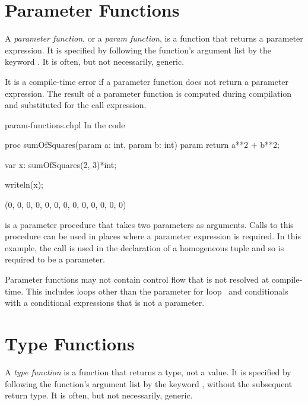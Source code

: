 \section{Parameter Functions}
\label{Parameter_Functions}

A \emph{parameter function}, or a \emph{param function}, is a function that returns a parameter
expression.  It is specified by following the function's argument list
by the keyword .  It is often, but not necessarily,
generic.

It is a compile-time error if a parameter function does not return a
parameter expression.  The result of a parameter function is computed
during compilation and substituted for the call expression.

\begin{chapelexample}{param-functions.chpl}
In the code
\begin{chapel}
proc sumOfSquares(param a: int, param b: int) param
  return a**2 + b**2;

var x: sumOfSquares(2, 3)*int;
\end{chapel}
\begin{chapelpost}
writeln(x);
\end{chapelpost}
\begin{chapeloutput}
(0, 0, 0, 0, 0, 0, 0, 0, 0, 0, 0, 0, 0)
\end{chapeloutput}
 is a parameter procedure that takes
two parameters as arguments.  Calls to this procedure can be used in
places where a parameter expression is required.  In this example, the
call is used in the declaration of a homogeneous tuple and so is
required to be a parameter.
\end{chapelexample}

Parameter functions may not contain control flow that is not resolved
at compile-time.  This includes loops other than the parameter for
loop~ and conditionals with a conditional
expressions that is not a parameter.


\section{Type Functions}
\label{Type_Functions}

A \emph{type function} is a function that returns a type, not a value.  It is specified by
following the function's argument list by the keyword , without the subsequent return type.  It
is often, but not necessarily, generic.

